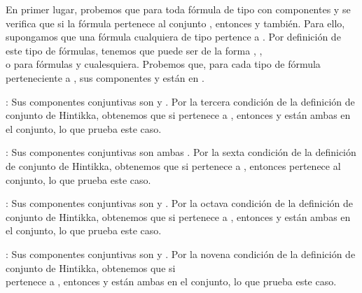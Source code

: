 \begin{isabellebody}
\begin{isamarkuptext}
\begin{demostracion}
  En primer lugar, probemos que para toda fórmula de tipo \isa{{\isasymalpha}} con 
  componentes  y  se verifica que si la fórmula pertenece al conjunto 
  , entonces  y  también. Para ello, supongamos que una fórmula 
  cualquiera de tipo \isa{{\isasymalpha}} pertence a . Por definición de este tipo de
  fórmulas, tenemos que \isa{{\isasymalpha}} puede ser de la forma , ,\\  
  o  para fórmulas  y  cualesquiera. Probemos que, para cada
  tipo de fórmula \isa{{\isasymalpha}} perteneciente a , sus componentes  y  están en
  .

  : Sus componentes conjuntivas son  y . 
  Por la tercera condición de la definición de conjunto de Hintikka, obtenemos 
  que si  pertenece a , entonces  y  están ambas en el conjunto,
  lo que prueba este caso.
    
  : Sus componentes conjuntivas son ambas .
  Por la sexta condición de la definición de conjunto de Hintikka, obtenemos que
  si  pertenece a , entonces  pertenece al conjunto, lo que prueba
  este caso.

  : Sus componentes conjuntivas son  y . 
  Por la octava condición de la definición de conjunto de Hintikka, obtenemos 
  que si  pertenece a , entonces  y  están ambas en el conjunto,
  lo que prueba este caso.

  : Sus componentes conjuntivas son  y . 
  Por la novena condición de la definición de conjunto de Hintikka, obtenemos 
  que si\\  pertenece a , entonces  y  están ambas en el conjunto,
  lo que prueba este caso.


\end{demostracion}
\end{isamarkuptext}
\end{isabellebody}
